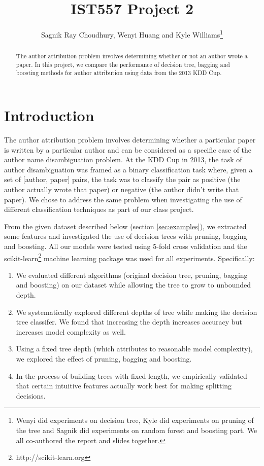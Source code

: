 \documentclass[letterpaper,12pt]{article}
\title{IST557 Project 2}
\author{Sagnik Ray Choudhury, Wenyi Huang and Kyle Williams\footnote{Wenyi did experiments on decision tree, Kyle did experiments on pruning of the tree and Sagnik did experiments on random forest and boosting part. We all co-authored the report and slides together.}}
\begin{document}
\maketitle

\begin{abstract}
The author attribution problem involves determining whether or not an author wrote a paper. In this project, we compare the performance of decision tree, bagging and boosting methods for author attribution using data from the 2013 KDD Cup. 
\end{abstract}

\section{Introduction}
The author attribution problem involves determining whether a particular paper is written by a particular author and can be considered as a specific case of the author name disambiguation problem. At the KDD Cup in 2013, the task of author disambiguation was framed as a binary classification task where, given a set of [author, paper] pairs, the task was to classify the pair as positive (the author actually wrote that paper) or negative (the author didn't write that paper). We chose to address the same problem when investigating the use of different classification techniques as part of our class project.

From the given dataset described below (section \ref{sec:examples}), we extracted some features and investigated the use of decision trees with pruning, bagging and boosting. All our models were tested using 5-fold cross validation and the scikit-learn\footnote{http://scikit-learn.org} machine learning package was used for all experiments. Specifically: 
\begin{enumerate}
\item We evaluated different algorithms (original decision tree, pruning, bagging and boosting) on our dataset while allowing the tree to grow to unbounded depth. 
\item We systematically explored different depths of tree while making the decision tree classifer. We found that increasing the depth increases accuracy but increases model complexity as well. 
\item Using a fixed tree depth (which attributes to reasonable model complexity), we explored the effect of pruning, bagging and boosting. 
\item In the process of building trees with fixed length, we empirically validated that certain intuitive features actually work best for making splitting decisions.
\end{enumerate}
\end{document}
